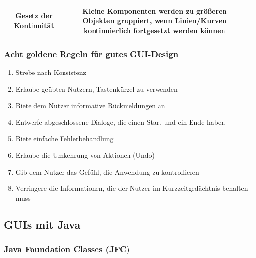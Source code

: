 \documentclass{scrartcl}
\begin{document}
\begin{tabular}{|c|c|c|}
	\hline Gesetz der Kontinuität & \parbox[c][4cm]{5cm}{Kleine Komponenten werden zu größeren Objekten gruppiert, wenn Linien/Kurven kontinuierlich fortgesetzt werden können} &   \\ 
	\hline 
\end{tabular}

\subsubsection{Acht goldene Regeln für gutes GUI-Design}

\begin{enumerate}
	\item Strebe nach Konsistenz
	\item Erlaube geübten Nutzern, Tastenkürzel zu verwenden
	\item Biete dem Nutzer informative Rückmeldungen an
	\item Entwerfe abgeschlossene Dialoge, die einen Start und ein Ende haben
	\item Biete einfache Fehlerbehandlung
	\item Erlaube die Umkehrung von Aktionen (Undo)
	\item Gib dem Nutzer das Gefühl, die Anwendung zu kontrollieren
	\item Verringere die Informationen, die der Nutzer im Kurzzeitgedächtnis behalten muss
\end{enumerate}

\subsection{GUIs mit Java}

\subsubsection{Java Foundation Classes (JFC)}
\end{document}
